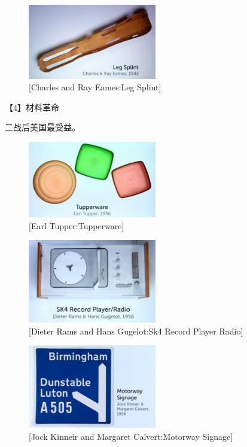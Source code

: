 \documentclass[UTF8]{../RepresentationUniverse}
\begin{document}
\begin{figure}[h]
    \centering
    \includegraphics[width=0.5\textwidth]{./src/figures/Leg Splint_2023-04-09_20-30-14.png}
    \caption{[Charles and Ray Eames:Leg Splint]}
    \label{figure:Leg Splint}
\end{figure}



【4】材料革命

二战后美国最受益。
\begin{figure}[h]
    \centering
    \includegraphics[width=0.5\textwidth]{./src/figures/Tupperware_2023-04-09_20-37-50.png}
    \caption{[Earl Tupper:Tupperware]}
    \label{figure:Tupperware}
\end{figure}



\begin{figure}[h]
    \centering
    \includegraphics[width=0.5\textwidth]{./src/figures/Sk4 Record Player Radio_2023-04-09_20-40-36.png}
    \caption{[Dieter Rams and Hans Gugelot:Sk4 Record Player Radio]}
    \label{figure:Sk4 Record Player Radio}
\end{figure}


\begin{figure}[h]
    \centering
    \includegraphics[width=0.5\textwidth]{./src/figures/Motorway Signage_2023-04-09_20-43-34.png}
    \caption{[Jock Kinneir and Margaret Calvert:Motorway Signage]}
    \label{figure:Motorway Signage}
\end{figure}
\end{document}
